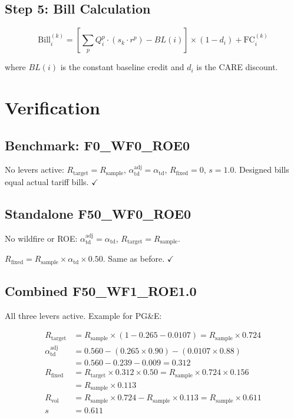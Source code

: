 \documentclass[11pt]{article}
\begin{document}
\subsection{Step 5: Bill Calculation}

\begin{equation}
\text{Bill}_i^{(k)} = \left[\sum_p Q_i^p \cdot (s_k \cdot r^p) - BL(i)\right] \times (1 - d_i) + \text{FC}_i^{(k)}
\end{equation}

where $BL(i)$ is the constant baseline credit and $d_i$ is the CARE discount.

\section{Verification}

\subsection{Benchmark: F0\_WF0\_ROE0}

No levers active: $R_{\text{target}} = R_{\text{sample}}$, $\alpha_{\text{td}}^{\text{adj}} = \alpha_{\text{td}}$, $R_{\text{fixed}} = 0$, $s = 1.0$. Designed bills equal actual tariff bills. $\checkmark$

\subsection{Standalone F50\_WF0\_ROE0}

No wildfire or ROE: $\alpha_{\text{td}}^{\text{adj}} = \alpha_{\text{td}}$, $R_{\text{target}} = R_{\text{sample}}$.

$R_{\text{fixed}} = R_{\text{sample}} \times \alpha_{\text{td}} \times 0.50$. Same as before. $\checkmark$

\subsection{Combined F50\_WF1\_ROE1.0}

All three levers active. Example for PG\&E:

\begin{align}
R_{\text{target}} &= R_{\text{sample}} \times (1 - 0.265 - 0.0107) = R_{\text{sample}} \times 0.724 \\
\alpha_{\text{td}}^{\text{adj}} &= 0.560 - (0.265 \times 0.90) - (0.0107 \times 0.88) \\
    &= 0.560 - 0.239 - 0.009 = 0.312 \\
R_{\text{fixed}} &= R_{\text{target}} \times 0.312 \times 0.50 = R_{\text{sample}} \times 0.724 \times 0.156 \\
    &= R_{\text{sample}} \times 0.113 \\
R_{\text{vol}} &= R_{\text{sample}} \times 0.724 - R_{\text{sample}} \times 0.113 = R_{\text{sample}} \times 0.611 \\
s &= 0.611
\end{align}
\end{document}
